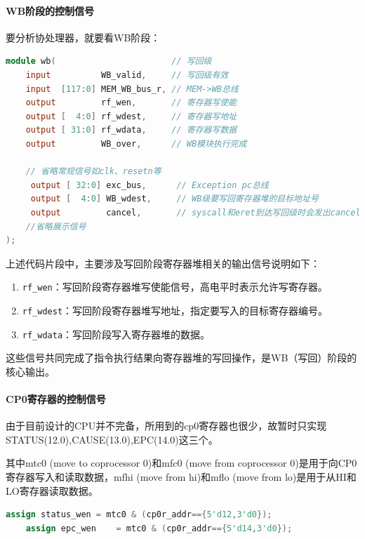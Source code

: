 \documentclass[a4paper]{article}
\begin{document}
\paragraph{WB阶段的控制信号}


要分析协处理器，就要看WB阶段：

\begin{lstlisting}[language=Verilog]
module wb(                       // 写回级
    input          WB_valid,     // 写回级有效
    input  [117:0] MEM_WB_bus_r, // MEM->WB总线
    output         rf_wen,       // 寄存器写使能
    output [  4:0] rf_wdest,     // 寄存器写地址
    output [ 31:0] rf_wdata,     // 寄存器写数据
    output         WB_over,      // WB模块执行完成

    // 省略常规信号如clk、resetn等
     output [ 32:0] exc_bus,      // Exception pc总线
     output [  4:0] WB_wdest,     // WB级要写回寄存器堆的目标地址号
     output         cancel,       // syscall和eret到达写回级时会发出cancel信号，取消已经取出的正在其他流水级执行的指令
    //省略展示信号
);
\end{lstlisting}

上述代码片段中，主要涉及写回阶段寄存器堆相关的输出信号说明如下：

\begin{enumerate}
    \item \texttt{rf\_wen}：写回阶段寄存器堆写使能信号，高电平时表示允许写寄存器。
    \item \texttt{rf\_wdest}：写回阶段寄存器堆写地址，指定要写入的目标寄存器编号。
    \item \texttt{rf\_wdata}：写回阶段写入寄存器堆的数据。
\end{enumerate}

这些信号共同完成了指令执行结果向寄存器堆的写回操作，是WB（写回）阶段的核心输出。

\paragraph{CP0寄存器的控制信号}

由于目前设计的CPU并不完备，所用到的cp0寄存器也很少，故暂时只实现STATUS(12.0),CAUSE(13.0),EPC(14.0)这三个。

其中mtc0 (move to coprocessor 0)和mfc0 (move from coprocessor 0)是用于向CP0寄存器写入和读取数据，mfhi (move from hi)和mflo (move from lo)是用于从HI和LO寄存器读取数据。

\begin{lstlisting}[language=Verilog]
    assign status_wen = mtc0 & (cp0r_addr=={5'd12,3'd0});
    assign epc_wen    = mtc0 & (cp0r_addr=={5'd14,3'd0});
\end{lstlisting}
\end{document}
